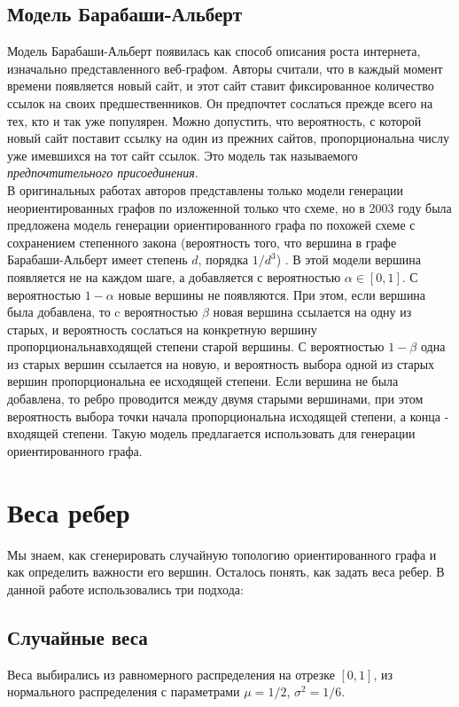 \subsection{Модель Барабаши-Альберт}
Модель Барабаши-Альберт появилась как способ описания роста интернета, изначально представленного веб-графом. Авторы считали, что в каждый момент времени появляется новый сайт, и этот сайт ставит фиксированное количество ссылок на своих предшественников. Он предпочтет сослаться прежде всего на тех, кто и так уже популярен. Можно допустить, что вероятность, с которой
новый сайт поставит ссылку на один из прежних сайтов, пропорциональна числу уже имевшихся на тот сайт ссылок. Это модель так называемого \textit{предпочтительного присоединения}.\\

В оригинальных работах авторов представлены только модели генерации неориентированных графов по изложенной только что схеме, но в 2003 году была предложена модель генерации ориентированного графа по похожей схеме с сохранением степенного закона (вероятность того, что вершина в графе Барабаши-Альберт имеет степень $d$, порядка $1/d^3$) \cite{barabashi2003}. В этой модели вершина появляется не на каждом шаге, а добавляется с вероятностью $\alpha\in [0,1]$. С вероятностью $1-\alpha$ новые вершины не появляются. При этом, если вершина была добавлена, то c вероятностью $\beta$ новая вершина ссылается на одну из старых, и вероятность сослаться на конкретную вершину пропорциональнавходящей степени старой вершины. С вероятностью $1-\beta$ одна из старых вершин ссылается на новую, и вероятность выбора одной из старых вершин пропорциональна ее исходящей степени. Если вершина не была добавлена, то ребро проводится между двумя старыми вершинами, при этом вероятность выбора точки начала пропорциональна исходящей степени, а конца - входящей степени. Такую модель предлагается использовать для генерации ориентированного графа.

\section{Веса ребер}
Мы знаем, как сгенерировать случайную топологию ориентированного графа и как определить важности его вершин. Осталось понять, как задать веса ребер. В данной работе использовались три подхода:

\subsection{Случайные веса}
Веса выбирались из равномерного распределения на отрезке $[0,1]$, из нормального распределения с параметрами $\mu=1/2$, $\sigma^2=1/6$.

